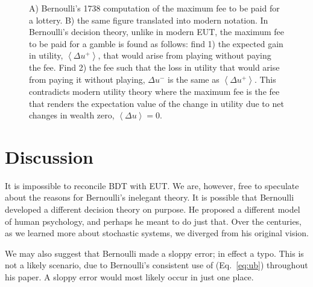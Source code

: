 \documentclass[pdftex]{article}
\newcommand{\ave}[1]{\left\langle#1 \right\rangle}
\newcommand{\eref}[1]{(Eq.~\ref{eq:#1})}
\newcommand{\flabel}[1]{\label{fig:#1}}
\newcommand{\seclabel}[1]{\label{section:#1}}
\newcommand{\Du}{\Delta u}
\begin{document}
\begin{figure}
\begin{picture}
\end{picture}
\caption{\small  A) Bernoulli's 1738 computation of the maximum fee to be paid for a lottery. B) the same figure translated into modern notation. In Bernoulli's decision theory, unlike in modern EUT, the maximum fee to be paid for a gamble is found as follows: find 1) the expected gain in utility, $\ave{\Du^+}$, that would arise from playing without paying the fee. Find 2) the fee such that the loss in utility that would arise from paying it without playing, $\Du^-$ is the same as $\ave{\Du^+}$. This contradicts modern utility theory where the maximum fee is the fee that renders the expectation value of the change in utility due to net changes in wealth zero, $\ave{\Du}=0$.}
\flabel{key}
\end{figure}


\section{Discussion}
\seclabel{Discussion}
It is impossible to reconcile BDT with EUT. 
We are, however, free to speculate about the reasons for Bernoulli's inelegant theory. It is possible that Bernoulli developed a different decision theory on purpose. He proposed a different model of human psychology, and perhaps he meant to do just that. Over the centuries, as we learned more about stochastic systems, we diverged from his original vision. 

We may also suggest that Bernoulli made a sloppy error; in effect a typo. This is not a likely scenario, due to Bernoulli's consistent use of \eref{ub} throughout his paper. A sloppy error would most likely occur in just one place.
\end{document}
